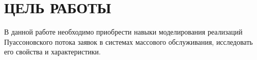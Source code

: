 \section{ЦЕЛЬ РАБОТЫ}

В данной работе необходимо приобрести навыки моделирования реализаций
Пуассоновского потока заявок в системах массового обслуживания,
исследовать его свойства и характеристики.
